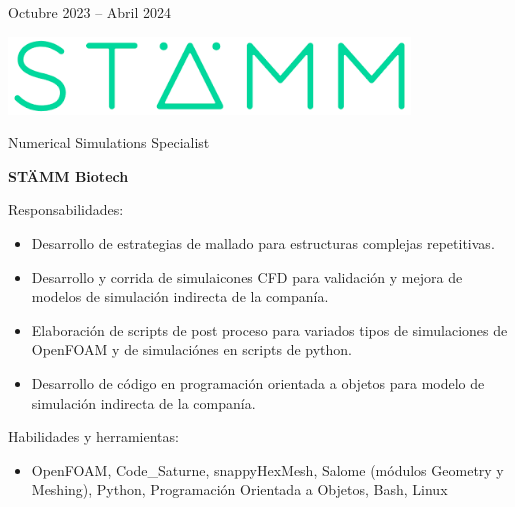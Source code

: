 \documentclass[a4paper,10pt]{article}
\newlength{\cvcolumngapwidth}
\newlength{\cvleftcolumnwidth}
\newlength{\cvrightcolumnwidth}
\newcommand{\cvtitlestyle}[1]{{\large\cvtitlefont\textcolor{cvtitlecolor}{#1}}}
\newcommand{\cvdurationstyle}[1]{{\small\cvdurationfont\textcolor{cvdurationcolor}{#1}}}
\newlength{\cvafteritemskipamount}
\newlength{\cvaftertitleskipamount}
\newlength{\cvparskip}
\newcommand{\cvitem}[2]{
    \begin{minipage}[t]{\cvleftcolumnwidth}
        \raggedleft #1
    \end{minipage}%
    \hspace{\cvcolumngapwidth}%
    \begin{minipage}[t]{\cvrightcolumnwidth}
        \setlength{\parskip}{\cvparskip} #2
    \end{minipage}

    \vspace{\cvafteritemskipamount}
}
\newcommand{\cvtitle}[1]{
    \cvtitlestyle{#1}

    \vspace{\cvaftertitleskipamount}
    \vspace{-\cvparskip}
}
\begin{document}
\cvitem{
	\cvdurationstyle{Octubre 2023 -- Abril 2024}
}{
	\begin{minipage}{0.1\textwidth}
		\centering
		\includegraphics[width=0.8\textwidth]{../logos-photos/Logo_STAMM.png}   
	\end{minipage}
	\cvtitle{Numerical Simulations Specialist}
	
	\textbf{STÄMM Biotech}
	
    Responsabilidades:
    \begin{itemize}
        \item Desarrollo de estrategias de mallado para estructuras complejas repetitivas.
        \item Desarrollo y corrida de simulaicones CFD para validación y mejora de modelos de simulación
            indirecta de la companía.
        \item Elaboración de scripts de post proceso para variados tipos de simulaciones de OpenFOAM y de simulaciónes
            en scripts de python.
        \item Desarrollo de código en programación orientada a objetos para modelo de simulación indirecta de la
            companía.
    \end{itemize}

    Habilidades y herramientas:
    \begin{itemize}
        \item OpenFOAM, Code\_Saturne, snappyHexMesh, Salome (módulos Geometry y Meshing), Python, Programación
            Orientada a Objetos, Bash, Linux
    \end{itemize}
	
}
\end{document}
